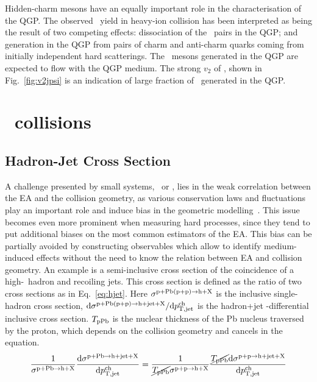 \documentclass[10pt]{article}
\begin{document}
Hidden-charm mesons have an equally important role in the characterisation of the QGP.
The observed \jpsi\ yield in heavy-ion collision has been interpreted as being the result of two competing effects: dissociation of the \ccbar\ pairs in the QGP; and generation in the QGP from pairs of charm and anti-charm quarks coming from initially independent hard scatterings.
The \jpsi\ mesons generated in the QGP are expected to flow with the QGP medium. The strong $v_2$ of \jpsi, shown in Fig.~\ref{fig:v2jpsi} is an indication of large fraction of \jpsi\ generated in the QGP.

\section{\pPb\ collisions}

\subsection{Hadron-Jet Cross Section} 
A challenge presented by small systems, \pp\ or \pPb, lies in the weak correlation between the EA and the collision geometry,
as various conservation laws and fluctuations play an important role and induce bias in the geometric modelling~\cite{}. 
This issue becomes even more prominent when measuring hard processes, since they tend to put additional biases on the most common estimators of the EA.
This bias can be partially avoided by constructing observables which allow to identify medium-induced effects without the need to know the relation between EA and collision geometry. 
An example is a semi-inclusive cross section of the coincidence of a high-\pt\ hadron and recoiling jets.
This cross section is defined as the ratio of two cross sections as in Eq.~\ref{eq:hjet}. Here $\sigma^{{\rm p+Pb (p+p)}\rightarrow{\rm h+X}}$ is the inclusive single-hadron cross
section, $\mathrm{d}\sigma^{{\rm p+Pb (p+p)}\rightarrow{\rm h+jet+X}}/ \mathrm{d}p_{\rm T,jet}^{\rm ch}$ is the hadron+jet \pt-differential inclusive cross section.
$T_{\rm pPb}$ is the nuclear thickness of the Pb nucleus traversed by the proton, which depends on the collision geometry and cancels in the equation.
\begin{equation}
\frac{1}{\sigma^{{\rm p+Pb}\rightarrow{\rm h+X}}} \frac{\mathrm{d}\sigma^{{\rm p+Pb}\rightarrow{\rm h+jet+X}}}{\mathrm{d}p_{\rm T,jet}^{\rm ch}} = 
\frac{1}{\cancel{T_{\rm pPb}}\sigma^{{\rm p+p}\rightarrow{\rm h+X}}} \frac{\cancel{T_{\rm pPb}}\mathrm{d}\sigma^{{\rm p+p}\rightarrow{\rm h+jet+X}}}{\mathrm{d}p_{\rm T,jet}^{\rm ch}}
\label{eq:hjet}
\end{equation}
\end{document}
